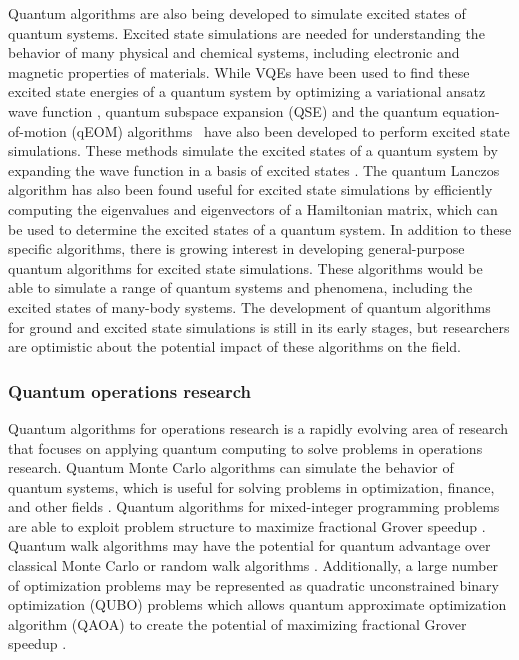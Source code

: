 \documentclass{article}
\begin{document}
Quantum algorithms are also being developed to simulate excited states of quantum systems. Excited state simulations are needed for understanding the behavior of many physical and chemical systems, including electronic and magnetic properties of materials. While VQEs have been used to find these excited state energies of a quantum system by optimizing a variational ansatz wave function \cite{higgott2019variational}, quantum subspace expansion (QSE) and the quantum equation-of-motion (qEOM) algorithms~\cite{OllitraultqEOM2020} have also been developed to perform excited state simulations. \cite{motta_quantum_2023} These methods simulate the excited states of a quantum system by expanding the wave function in a basis of excited states \cite{mcclean2017hybrid}.
 The quantum Lanczos algorithm has also been found useful for excited state simulations \cite{kirby2022exact} by efficiently computing the eigenvalues and eigenvectors of a Hamiltonian matrix, which can be used to determine the excited states of a quantum system. In addition to these specific algorithms, there is growing interest in developing general-purpose quantum algorithms for excited state simulations. These algorithms would be able to simulate a range of quantum systems and phenomena, including the excited states of many-body systems. The development of quantum algorithms for ground and excited state simulations is still in its early stages, but researchers are optimistic about the potential impact of these algorithms on the field.


\subsubsection{Quantum operations research}
Quantum algorithms for operations research is a rapidly evolving area of research that focuses on applying quantum computing to solve problems in operations research. Quantum Monte Carlo algorithms can simulate the behavior of quantum systems, which is useful for solving problems in optimization, finance, and other fields \cite{patti2022markov}. Quantum algorithms for mixed-integer programming problems are able to exploit problem structure to maximize fractional Grover speedup \cite{gambella2020multiblock}.
Quantum walk algorithms may have the potential for quantum advantage over classical Monte Carlo or random walk algorithms \cite{szegedy2004quantum, wocjan2021szegedy, childs2009universal}. Additionally, a large number of optimization problems may be represented as quadratic unconstrained binary optimization (QUBO) problems which allows quantum approximate optimization algorithm (QAOA) to create the potential of maximizing fractional Grover speedup \cite{farhi2014quantum, stkechly2023connecting}.
\end{document}
